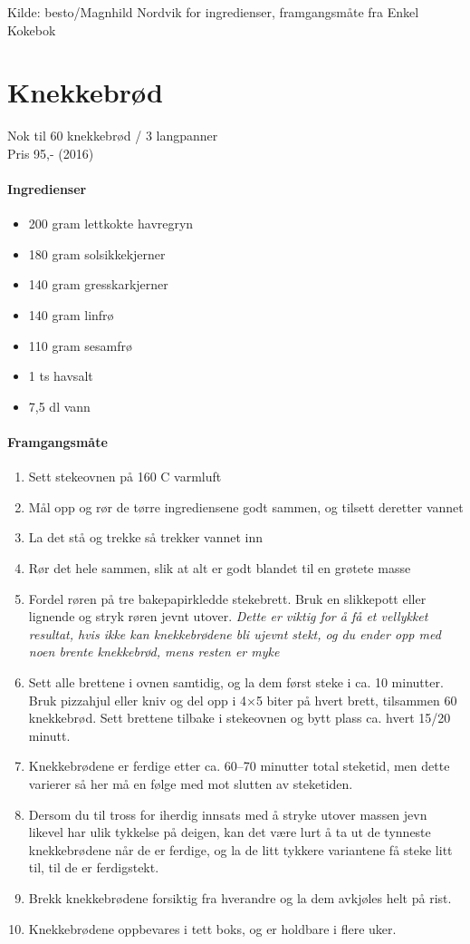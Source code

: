 \documentclass[12pt,a4paper]{book}
\begin{document}
Kilde: besto/Magnhild Nordvik for ingredienser, framgangsmåte fra Enkel Kokebok
\clearpage{}
\clearpage{}\section{﻿Knekkebrød}
Nok til 60 knekkebrød / 3 langpanner\\
Pris 95,- (2016)

\paragraph{Ingredienser}
\begin{itemize}[noitemsep]
	\item 200 gram lettkokte havregryn
	\item 180 gram solsikkekjerner
	\item 140 gram gresskarkjerner
	\item 140 gram linfrø
	\item 110 gram sesamfrø
	\item 1 ts havsalt
	\item 7,5 dl vann
\end{itemize}

\paragraph{Framgangsmåte}
\begin{enumerate}[noitemsep]
	\item Sett stekeovnen på 160 \degree C varmluft
	\item Mål opp og rør de tørre ingrediensene godt sammen, og tilsett deretter vannet
	\item La det stå og trekke så trekker vannet inn
	\item Rør det hele sammen, slik at alt er godt blandet til en grøtete masse
	\item Fordel røren på tre bakepapirkledde stekebrett. Bruk en slikkepott eller lignende og stryk røren jevnt utover. \emph{Dette er viktig for å få et vellykket resultat, hvis ikke kan knekkebrødene bli ujevnt stekt, og du ender opp med noen brente knekkebrød, mens resten er myke}
	\item Sett alle brettene i ovnen samtidig, og la dem først steke i ca. 10 minutter. Bruk pizzahjul eller kniv og del opp i 4×5 biter på hvert brett, tilsammen 60 knekkebrød. Sett brettene tilbake i stekeovnen og bytt plass ca. hvert 15/20 minutt.
	\item Knekkebrødene er ferdige etter ca. 60--70 minutter total steketid, men dette varierer så her må en følge med mot slutten av steketiden.
	\item Dersom du til tross for iherdig innsats med å stryke utover massen jevn likevel har ulik tykkelse på deigen, kan det være lurt å ta ut de tynneste knekkebrødene når de er ferdige, og la de litt tykkere variantene få steke litt til, til de er ferdigstekt.
	\item Brekk knekkebrødene forsiktig fra hverandre og la dem avkjøles helt på rist.
	\item Knekkebrødene oppbevares i tett boks, og er holdbare i flere uker.
\end{enumerate}
\end{document}
